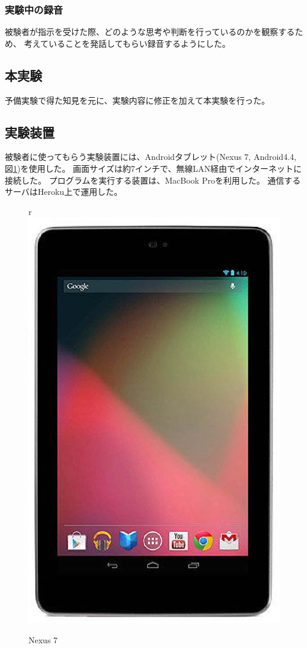 \subsubsection{実験中の録音}\label{ux5b9fux9a13ux4e2dux306eux9332ux97f3}

被験者が指示を受けた際、どのような思考や判断を行っているのかを観察するため、
考えていることを発話してもらい録音するようにした。

\subsection{本実験}\label{ux672cux5b9fux9a13}

予備実験で得た知見を元に、実験内容に修正を加えて本実験を行った。

\subsection{実験装置}\label{ux5b9fux9a13ux88c5ux7f6e}

被験者に使ってもらう実験装置には、Androidタブレット(Nexus 7, Android4.4,
図\ref{fig:nexus7})を使用した。
画面サイズは約7インチで、無線LAN経由でインターネットに接続した。
プログラムを実行する装置は、MacBook Proを利用した。
通信するサーバはHeroku上で運用した。

\begin{figure}[htbp]
  \begin{center}r
  \includegraphics[width=.5\linewidth]{images/nexus7.eps}
  \end{center}
  \caption{Nexus 7}
  \label{fig:nexus7}
\end{figure}

